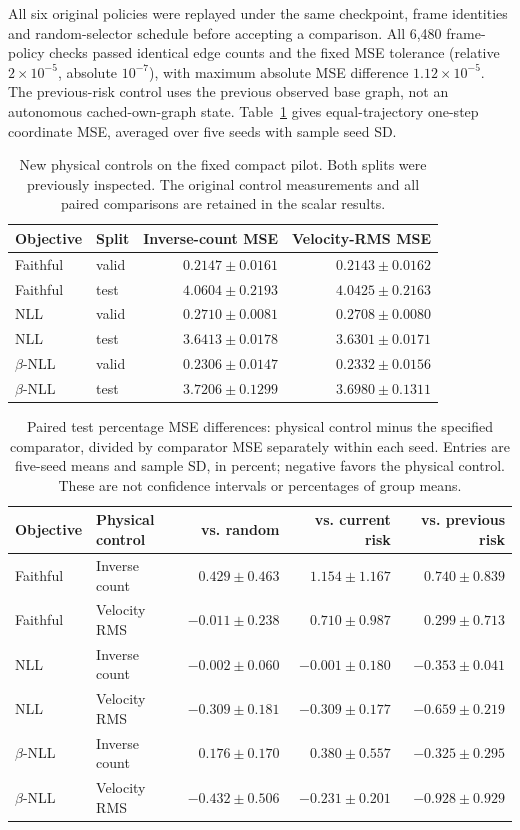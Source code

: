 All six original policies were replayed under the same checkpoint, frame
identities and random-selector schedule before accepting a comparison.
All 6,480 frame-policy checks passed identical edge counts and the fixed
MSE tolerance (relative $2\times10^{-5}$, absolute $10^{-7}$), with maximum
absolute MSE difference $1.12\times10^{-5}$. The previous-risk control uses
the previous observed base graph, not an autonomous cached-own-graph state.
Table~\ref{tab:physical-allocation-mse} gives equal-trajectory one-step
coordinate MSE, averaged over five seeds with sample seed SD.

\begin{table}[ht]
\centering\small
\caption{New physical controls on the fixed compact pilot. Both splits were
previously inspected. The original control measurements and all paired
comparisons are retained in the scalar results.}
\label{tab:physical-allocation-mse}
\begin{tabular}{llrr}
\toprule
Objective & Split & Inverse-count MSE & Velocity-RMS MSE\\
\midrule
Faithful & valid & $0.2147\pm0.0161$ & $0.2143\pm0.0162$\\
Faithful & test & $4.0604\pm0.2193$ & $4.0425\pm0.2163$\\
NLL & valid & $0.2710\pm0.0081$ & $0.2708\pm0.0080$\\
NLL & test & $3.6413\pm0.0178$ & $3.6301\pm0.0171$\\
$\beta$-NLL & valid & $0.2306\pm0.0147$ & $0.2332\pm0.0156$\\
$\beta$-NLL & test & $3.7206\pm0.1299$ & $3.6980\pm0.1311$\\
\bottomrule
\end{tabular}
\end{table}

\begin{table}[ht]
\centering\small
\caption{Paired test percentage MSE differences: physical control minus the
specified comparator, divided by comparator MSE separately within each seed.
Entries are five-seed means and sample SD, in percent; negative favors the
physical control. These are not confidence intervals or percentages of group means.}
\label{tab:physical-allocation-paired}
\begin{tabular}{llrrr}
\toprule
Objective & Physical control & vs. random & vs. current risk & vs. previous risk\\
\midrule
Faithful & Inverse count & $0.429\pm0.463$ & $1.154\pm1.167$ & $0.740\pm0.839$\\
Faithful & Velocity RMS & $-0.011\pm0.238$ & $0.710\pm0.987$ & $0.299\pm0.713$\\
NLL & Inverse count & $-0.002\pm0.060$ & $-0.001\pm0.180$ & $-0.353\pm0.041$\\
NLL & Velocity RMS & $-0.309\pm0.181$ & $-0.309\pm0.177$ & $-0.659\pm0.219$\\
$\beta$-NLL & Inverse count & $0.176\pm0.170$ & $0.380\pm0.557$ & $-0.325\pm0.295$\\
$\beta$-NLL & Velocity RMS & $-0.432\pm0.506$ & $-0.231\pm0.201$ & $-0.928\pm0.929$\\
\bottomrule
\end{tabular}
\end{table}

